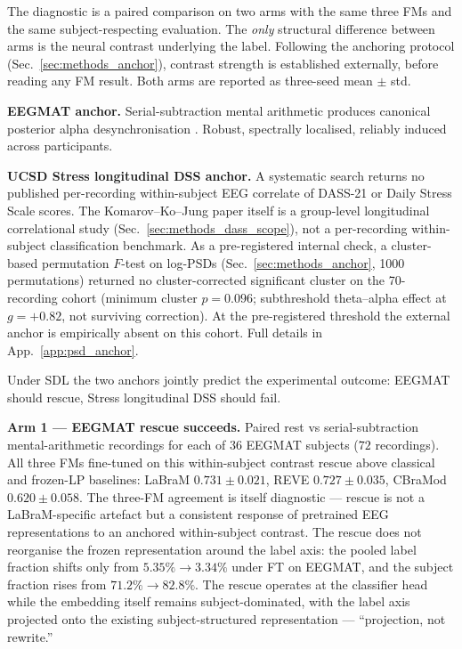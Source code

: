 The diagnostic is a paired comparison on two arms with the same three
FMs and the same subject-respecting evaluation. The \emph{only}
structural difference between arms is the neural contrast underlying
the label. Following the anchoring protocol
(Sec.~\ref{sec:methods_anchor}), contrast strength is established
externally, before reading any FM result. Both arms are reported as
three-seed mean $\pm$ std.

\textbf{EEGMAT anchor.} Serial-subtraction mental arithmetic produces
canonical posterior alpha desynchronisation
\citep{klimesch1999,pfurtscheller1979,klimesch2012update}. Robust,
spectrally localised, reliably induced across participants.

\textbf{UCSD Stress longitudinal DSS anchor.} A systematic search
returns no published per-recording within-subject EEG correlate of
DASS-21 or Daily Stress Scale scores. The Komarov--Ko--Jung paper
itself is a group-level longitudinal correlational study
(Sec.~\ref{sec:methods_dass_scope}), not a per-recording
within-subject classification benchmark. As a pre-registered internal
check, a cluster-based permutation $F$-test on log-PSDs
(Sec.~\ref{sec:methods_anchor}, 1000 permutations) returned no
cluster-corrected significant cluster on the 70-recording cohort
(minimum cluster $p = 0.096$; subthreshold theta--alpha effect at
$g = +0.82$, not surviving correction). At the pre-registered
threshold the external anchor is empirically absent on this cohort.
Full details in App.~\ref{app:psd_anchor}.

Under SDL the two anchors jointly predict the experimental outcome:
EEGMAT should rescue, Stress longitudinal DSS should fail.

\textbf{Arm 1 --- EEGMAT rescue succeeds.} Paired rest vs
serial-subtraction mental-arithmetic recordings for each of $36$
EEGMAT subjects ($72$ recordings). All three FMs fine-tuned on this
within-subject contrast rescue above classical and frozen-LP
baselines: LaBraM $0.731 \pm 0.021$, REVE $0.727 \pm 0.035$, CBraMod
$0.620 \pm 0.058$. The three-FM agreement is itself diagnostic ---
rescue is not a LaBraM-specific artefact but a consistent response
of pretrained EEG representations to an anchored within-subject
contrast. The rescue does not reorganise the frozen representation
around the label axis: the pooled label fraction shifts only from
$5.35\% \to 3.34\%$ under FT on EEGMAT, and the subject fraction
rises from $71.2\% \to 82.8\%$. The rescue operates at the classifier
head while the embedding itself remains subject-dominated, with the
label axis projected onto the existing subject-structured
representation --- ``projection, not rewrite.''


